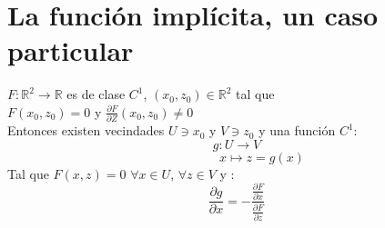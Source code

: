 \chapter{La función implícita, un caso particular}
\begin{Teo}
  $F:\mathbb{R}^2\rightarrow \mathbb{R}$ es de clase $C^{1}$, $(x_{0},z_{0}) \in \mathbb{R}^2$ tal que\\
  $F(x_{0},z_{0})=0$ y $ \frac{\partial F}{\partial Z}(x_{0},z_{0})\ne 0$\\
Entonces existen vecindades $U\ni x_{0} $ y $V\ni z_{0}$ y una funci\'on $C^1$:
    $$g:U\rightarrow V$$
   $$ \qquad \qquad x\longmapsto z=g(x)$$
Tal que $F(x,z)=0$ $\forall x \in U$, $\forall z\in V$ y :
$$\frac{\partial g}{\partial x} = - \frac{\frac{\partial F}{\partial x}}{\frac{\partial F}{\partial z}}$$
\end{Teo}

